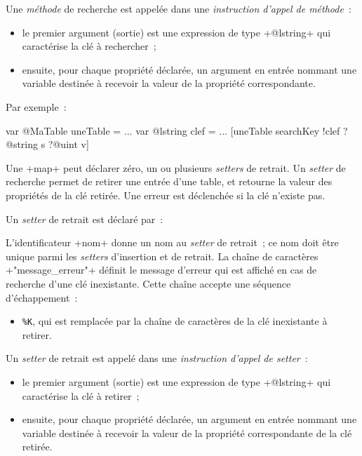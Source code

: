 Une \emph{méthode} de recherche est appelée dans une \emph{instruction d'appel de méthode}~:
\begin{itemize}
  \item le premier argument (sortie) est une expression de type \ggs+@lstring+ qui caractérise la clé à rechercher~;
  \item ensuite, pour chaque propriété déclarée, un argument en entrée nommant une variable destinée à recevoir la valeur de la propriété correspondante.
\end{itemize}

Par exemple~:
\begin{galgas}
var @MaTable uneTable = {}
...
var @lstring clef = ...
[uneTable searchKey !clef ?@string s ?@uint v]
\end{galgas}







Une \ggs+map+ peut déclarer zéro, un ou plusieurs \emph{setters} de retrait. Un \emph{setter} de recherche permet de retirer une entrée d'une table, et retourne la valeur des propriétés de la clé retirée. Une erreur est déclenchée si la clé n'existe pas.


Un \emph{setter} de retrait est déclaré par~:

\begin{galgas}
\end{galgas}

L'identificateur \ggs+nom+ donne un nom au \emph{setter} de retrait~; ce nom doit être unique parmi les \emph{setters} d'insertion et de retrait. La chaîne de caractères \ggs+"message_erreur"+ définit le message d'erreur qui est affiché en cas de recherche d'une clé inexistante. Cette chaîne accepte une séquence d'échappement~:
\begin{itemize}
  \item \texttt{\%K}, qui est remplacée par la chaîne de caractères de la clé inexistante à retirer.
\end{itemize}


Un \emph{setter} de retrait est appelé dans une \emph{instruction d'appel de setter}~:
\begin{itemize}
  \item le premier argument (sortie) est une expression de type \ggs+@lstring+ qui caractérise la clé à retirer~;
  \item ensuite, pour chaque propriété déclarée, un argument en entrée nommant une variable destinée à recevoir la valeur de la propriété correspondante de la clé retirée.
\end{itemize}

